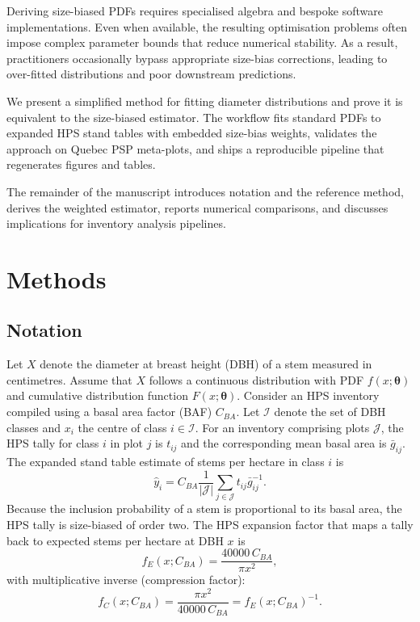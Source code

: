 \documentclass[12pt]{article}
\begin{document}
Deriving size-biased PDFs requires specialised algebra and bespoke software
implementations. Even when available, the resulting optimisation problems
often impose complex parameter bounds that reduce numerical stability. As a
result, practitioners occasionally bypass appropriate size-bias corrections,
leading to over-fitted distributions and poor downstream predictions.

We present a simplified method for fitting diameter distributions and prove
it is equivalent to the size-biased estimator. The workflow fits standard
PDFs to expanded HPS stand tables with embedded size-bias weights, validates
the approach on Quebec PSP meta-plots, and ships a reproducible pipeline
that regenerates figures and tables.

The remainder of the manuscript introduces notation and the reference method,
derives the weighted estimator, reports numerical comparisons, and discusses
implications for inventory analysis pipelines.

\section{Methods}
\label{sec:methods}

\subsection{Notation}
Let $X$ denote the diameter at breast height (DBH) of a stem measured in
centimetres. Assume that $X$ follows a continuous distribution with PDF
$f(x;\boldsymbol{\theta})$ and cumulative distribution function
$F(x;\boldsymbol{\theta})$. Consider an HPS inventory compiled using a basal
area factor (BAF) $C_{BA}$. Let $\mathcal{I}$ denote the set of DBH classes and
$x_i$ the centre of class $i \in \mathcal{I}$. For an inventory comprising
plots $\mathcal{J}$, the HPS tally for class $i$ in plot $j$ is $t_{ij}$ and
the corresponding mean basal area is $\bar{g}_{ij}$. The expanded stand table
estimate of stems per hectare in class $i$ is
\begin{equation}
  \hat{y}_i = C_{BA} \frac{1}{|\mathcal{J}|} \sum_{j \in \mathcal{J}} t_{ij} \bar{g}_{ij}^{-1}.
  \label{eq:stand-table}
\end{equation}
Because the inclusion probability of a stem is proportional to its basal area,
the HPS tally is size-biased of order two. The HPS expansion factor that maps a
tally back to expected stems per hectare at DBH $x$ is
\begin{equation}
  f_E(x; C_{BA}) = \frac{40000 \, C_{BA}}{\pi x^2},
  \label{eq:expansion}
\end{equation}
with multiplicative inverse (compression factor):
\begin{equation}
  f_C(x; C_{BA}) = \frac{\pi x^2}{40000 \, C_{BA}} = f_E(x; C_{BA})^{-1}.
  \label{eq:compression}
\end{equation}
\end{document}
